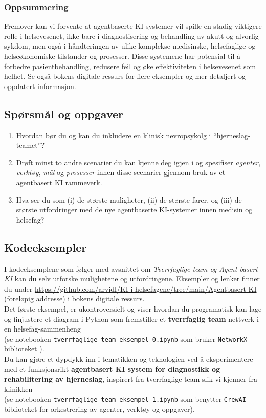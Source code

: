 \subsubsection*{Oppsummering}
Fremover kan vi forvente at agentbaserte KI-systemer vil spille en stadig viktigere rolle i helsevesenet, ikke bare i diagnostisering og behandling av akutt og alvorlig sykdom, men også i håndteringen av ulike komplekse medisinske, helsefaglige og helseøkonomiske tilstander og prosesser. Disse systemene har potensial til å forbedre pasientbehandling, redusere feil og øke effektiviteten i helsevesenet som helhet. Se også bokens digitale ressurs for flere eksempler og mer detaljert og oppdatert informasjon.



 \subsection*{Spørsmål og oppgaver}
\begin{enumerate}
\item Hvordan bør du og kan du inkludere en klinisk nevropsykolg i 
``hjerneslag-teamet''?
\item Drøft minst to andre scenarier du kan kjenne deg igjen i og spesifiser \textit{agenter}, \textit{verktøy}, \textit{mål} og \textit{prosesser} innen disse scenarier gjennom bruk av et agentbasert KI rammeverk.
\item Hva ser du som (i) de største muligheter, (ii) de største farer, og (iii) de største utfordringer med de nye agentbaserte KI-systemer innen medisin og helsefag?
\end{enumerate}

\subsection*{Kodeeksempler}
I kodeeksemplene som følger med avsnittet om \textit{Tverrfaglige team og Agent-basert KI} kan du selv utforske mulighetene og utfordringene. Eksempler og lenker finner du under {\small \url{https://github.com/arvidl/KI-i-helsefagene/tree/main/Agentbasert-KI}} (foreløpig addresse) i bokens digitale ressurs.\\

Det første eksempel, er ukontroversielt og viser hvordan du programatisk kan lage og finjustere et diagram i Python som fremstiller 
et \textbf{tverrfaglig team} nettverk i en helsefag-sammenheng \\ 
(se notebooken {\small \texttt{tverrfaglige-team-eksempel-0.ipynb}} som bruker \texttt{NetworkX}-biblioteket \cite{Hagberg2008}). \\

Du kan gjøre et dypdykk inn i tematikken og teknologien ved å eksperimentere med et funksjonsrikt \textbf{agentbasert KI system for diagnostikk og rehabilitering av hjerneslag}, inspirert fra tverrfaglige team slik vi kjenner fra klinikken \\ (se notebooken {\small \texttt{tverrfaglige-team-eksempel-1.ipynb}} som benytter \texttt{CrewAI} biblioteket for orkestrering av agenter, verktøy og oppgaver). \\




